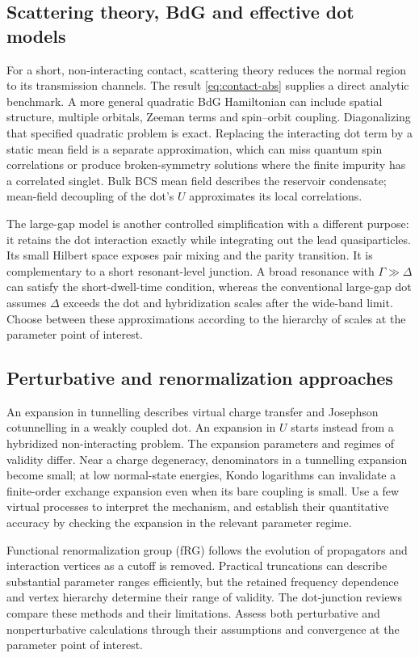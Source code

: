 \subsection{Scattering theory, BdG and effective dot models}

For a short, non-interacting contact, scattering theory reduces the normal
region to its transmission channels. The result \cref{eq:contact-abs} supplies
a direct analytic benchmark. A more general quadratic BdG Hamiltonian can
include spatial structure, multiple orbitals, Zeeman terms and spin--orbit
coupling. Diagonalizing that specified quadratic problem is exact. Replacing
the interacting dot term by a static mean field is a separate approximation,
which can miss quantum spin correlations or produce broken-symmetry solutions
where the finite impurity has a correlated singlet. Bulk BCS mean field describes
the reservoir condensate; mean-field decoupling of the dot's $U$ approximates its local correlations.

The large-gap model is another controlled simplification with a different
purpose: it retains the dot interaction exactly while integrating out the lead
quasiparticles. Its small Hilbert space exposes pair mixing and the parity
transition. It is complementary to a short resonant-level junction. A broad
resonance with $\Gamma\gg\Delta$ can satisfy the short-dwell-time condition,
whereas the conventional large-gap dot assumes $\Delta$ exceeds the dot and
hybridization scales after the wide-band limit. Choose between these approximations
according to the hierarchy of scales at the parameter point of interest.

\subsection{Perturbative and renormalization approaches}

An expansion in tunnelling describes virtual charge transfer and Josephson
cotunnelling in a weakly coupled dot. An expansion in $U$ starts instead from
a hybridized non-interacting problem. The expansion parameters and regimes of validity differ.
Near a charge degeneracy, denominators in a tunnelling expansion become small;
at low normal-state energies, Kondo logarithms can invalidate a finite-order
exchange expansion even when its bare coupling is small. Use a few virtual processes
to interpret the mechanism, and establish their quantitative accuracy by checking
the expansion in the relevant parameter regime.

Functional renormalization group (fRG) follows the evolution of propagators and
interaction vertices as a cutoff is removed. Practical truncations can describe
substantial parameter ranges efficiently, but the retained frequency dependence
and vertex hierarchy determine their range of validity. The dot-junction reviews
\cite{martinrodero2011josephson,meden2019andersonjosephson} compare these methods
and their limitations. Assess both perturbative and nonperturbative calculations
through their assumptions and convergence at the parameter point of interest.

